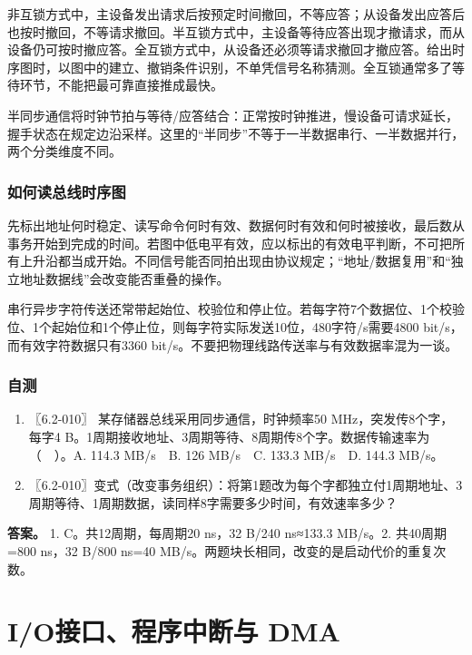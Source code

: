 非互锁方式中，主设备发出请求后按预定时间撤回，不等应答；从设备发出应答后也按时撤回，不等请求撤回。半互锁方式中，主设备等待应答出现才撤请求，而从设备仍可按时撤应答。全互锁方式中，从设备还必须等请求撤回才撤应答。给出时序图时，以图中的建立、撤销条件识别，不单凭信号名称猜测。全互锁通常多了等待环节，不能把最可靠直接推成最快。

半同步通信将时钟节拍与等待/应答结合：正常按时钟推进，慢设备可请求延长，握手状态在规定边沿采样。这里的``半同步''不等于一半数据串行、一半数据并行，两个分类维度不同。

\subsection{如何读总线时序图}\label{co-c07-h75}

先标出地址何时稳定、读写命令何时有效、数据何时有效和何时被接收，最后数从事务开始到完成的时间。若图中低电平有效，应以标出的有效电平判断，不可把所有上升沿都当成开始。不同信号能否同拍出现由协议规定；``地址/数据复用''和``独立地址数据线''会改变能否重叠的操作。

串行异步字符传送还常带起始位、校验位和停止位。若每字符7个数据位、1个校验位、1个起始位和1个停止位，则每字符实际发送10位，480字符/s需要4800 bit/s，而有效字符数据只有3360 bit/s。不要把物理线路传送率与有效数据率混为一谈。

\subsection{自测}\label{co-self7}

\begin{enumerate}
\def\labelenumi{\arabic{enumi}.}
\tightlist
\item
  〖6.2-010〗 某存储器总线采用同步通信，时钟频率50 MHz，突发传8个字，每字4 B。1周期接收地址、3周期等待、8周期传8个字。数据传输速率为（　）。A. 114.3 MB/s　B. 126 MB/s　C. 133.3 MB/s　D. 144.3 MB/s。
\item
  〖6.2-010〗变式（改变事务组织）：将第1题改为每个字都独立付1周期地址、3周期等待、1周期数据，读同样8字需要多少时间，有效速率多少？
\end{enumerate}

\textbf{答案。} 1. C。共12周期，每周期20 ns，32 B/240 ns≈133.3 MB/s。2. 共40周期=800 ns，32 B/800 ns=40 MB/s。两题块长相同，改变的是启动代价的重复次数。

\chapter{I/O接口、程序中断与 DMA}\label{co-ch8}

